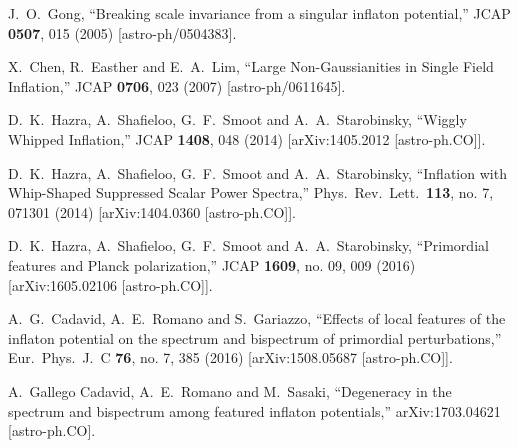 \documentclass[12pt]{article}
\begin{document}
\begin{thebibliography}{99}
  J.~O.~Gong,
  ``Breaking scale invariance from a singular inflaton potential,''
  JCAP {\bf 0507}, 015 (2005)
  [astro-ph/0504383].
  
  X.~Chen, R.~Easther and E.~A.~Lim,
  ``Large Non-Gaussianities in Single Field Inflation,''
  JCAP {\bf 0706}, 023 (2007)
  [astro-ph/0611645].
 
  D.~K.~Hazra, A.~Shafieloo, G.~F.~Smoot and A.~A.~Starobinsky,
  ``Wiggly Whipped Inflation,''
  JCAP {\bf 1408}, 048 (2014)
  [arXiv:1405.2012 [astro-ph.CO]].
 
  D.~K.~Hazra, A.~Shafieloo, G.~F.~Smoot and A.~A.~Starobinsky,
  ``Inflation with Whip-Shaped Suppressed Scalar Power Spectra,''
  Phys.\ Rev.\ Lett.\  {\bf 113}, no. 7, 071301 (2014)
  [arXiv:1404.0360 [astro-ph.CO]].
  
   
  D.~K.~Hazra, A.~Shafieloo, G.~F.~Smoot and A.~A.~Starobinsky,
  ``Primordial features and Planck polarization,''
  JCAP {\bf 1609}, no. 09, 009 (2016)
  [arXiv:1605.02106 [astro-ph.CO]].


 
  A.~G.~Cadavid, A.~E.~Romano and S.~Gariazzo,
  ``Effects of local features of the inflaton potential on the spectrum and bispectrum of primordial perturbations,''
  Eur.\ Phys.\ J.\ C {\bf 76}, no. 7, 385 (2016)
  [arXiv:1508.05687 [astro-ph.CO]].
  



  
  A.~Gallego Cadavid, A.~E.~Romano and M.~Sasaki,
  ``Degeneracy in the spectrum and bispectrum among featured inflaton potentials,''
  arXiv:1703.04621 [astro-ph.CO].
  

\end{thebibliography}
\end{document}

